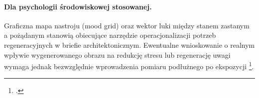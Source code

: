 \paragraph{Dla psychologii środowiskowej stosowanej.}
Graficzna mapa nastroju (mood grid) oraz wektor luki między stanem zastanym a pożądanym stanowią obiecujące narzędzie operacjonalizacji potrzeb regeneracyjnych w briefie architektonicznym. Ewentualne wnioskowanie o realnym wpływie wygenerowanego obrazu na redukcję stresu lub regenerację uwagi wymaga jednak bezwzględnie wprowadzenia pomiaru podłużnego po ekspozycji \footcite{kaplan1995restorative}.
